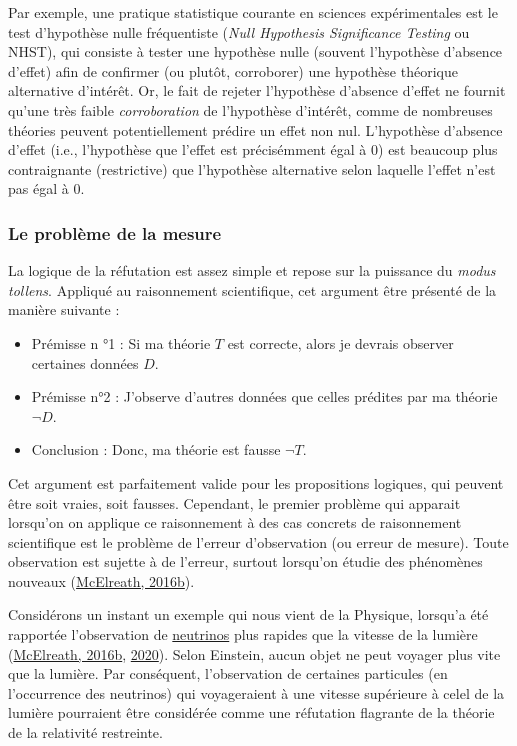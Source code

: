 \documentclass[
  a4paper,11pt,twoside,onecolumn,openright,final,oldfontcommands]{memoir}
\theoremstyle{definition}
\theoremstyle{definition}
\theoremstyle{definition}
\theoremstyle{definition}
\theoremstyle{remark}
\begin{document}
Par exemple, une pratique statistique courante en sciences expérimentales est le test d'hypothèse nulle fréquentiste (\emph{Null Hypothesis Significance Testing} ou NHST), qui consiste à tester une hypothèse nulle (souvent l'hypothèse d'absence d'effet) afin de confirmer (ou plutôt, corroborer) une hypothèse théorique alternative d'intérêt. Or, le fait de rejeter l'hypothèse d'absence d'effet ne fournit qu'une très faible \emph{corroboration} de l'hypothèse d'intérêt, comme de nombreuses théories peuvent potentiellement prédire un effet non nul. L'hypothèse d'absence d'effet (i.e., l'hypothèse que l'effet est précisémment égal à \(0\)) est beaucoup plus contraignante (restrictive) que l'hypothèse alternative selon laquelle l'effet n'est pas égal à \(0\).

\hypertarget{le-probluxe8me-de-la-mesure}{%
\subsubsection{Le problème de la mesure}\label{le-probluxe8me-de-la-mesure}}

La logique de la réfutation est assez simple et repose sur la puissance du \emph{modus tollens}. Appliqué au raisonnement scientifique, cet argument être présenté de la manière suivante :

\begin{itemize}
\item
  Prémisse n °1 : Si ma théorie \(T\) est correcte, alors je devrais observer certaines données \(D\).
\item
  Prémisse n°2 : J'observe d'autres données que celles prédites par ma théorie \(\lnot D\).
\item
  Conclusion : Donc, ma théorie est fausse \(\lnot T\).
\end{itemize}

Cet argument est parfaitement valide pour les propositions logiques, qui peuvent être soit vraies, soit fausses. Cependant, le premier problème qui apparait lorsqu'on on applique ce raisonnement à des cas concrets de raisonnement scientifique est le problème de l'erreur d'observation (ou erreur de mesure). Toute observation est sujette à de l'erreur, surtout lorsqu'on étudie des phénomènes nouveaux (\protect\hyperlink{ref-mcelreath_statistical_2016}{McElreath, 2016b}).

Considérons un instant un exemple qui nous vient de la Physique, lorsqu'a été rapportée l'observation de \href{https://en.wikipedia.org/wiki/Neutrino}{neutrinos} plus rapides que la vitesse de la lumière (\protect\hyperlink{ref-mcelreath_statistical_2016}{McElreath, 2016b}, \protect\hyperlink{ref-mcelreath_statistical_2020}{2020}). Selon Einstein, aucun objet ne peut voyager plus vite que la lumière. Par conséquent, l'observation de certaines particules (en l'occurrence des neutrinos) qui voyageraient à une vitesse supérieure à celel de la lumière pourraient être considérée comme une réfutation flagrante de la théorie de la relativité restreinte.
\end{document}
